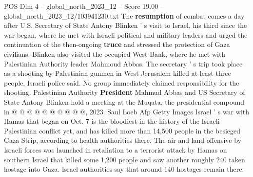 \begin{textsample}{POS Dim 4 – global\_north\_2023\_12 – Score 19.00 – global\_north\_2023\_12/103941230.txt}
The \textbf{resumption} of combat comes a day after U.S.
Secretary of State Antony Blinken ' s visit to Israel, his third since the war began, where he met with Israeli political and military leaders and urged the continuation of the then-ongoing \textbf{truce} and stressed the protection of Gaza civilians.
Blinken also visited the occupied West Bank, where he met with Palestinian Authority leader Mahmoud Abbas.
The secretary ' s trip took place as a shooting by Palestinian gunmen in West Jerusalem killed at least three people, Israeli police said.
No group immediately claimed responsibility for the shooting.
Palestinian Authority \textbf{President} Mahmud Abbas and US Secretary of State Antony Blinken hold a meeting at the Muqata, the presidential compound in @ @ @ @ @ @ @ @ @ @, 2023.
Saul Loeb Afp Getty Images Israel ' s war with Hamas that began on Oct. 7 is the bloodiest in the history of the Israeli-Palestinian conflict yet, and has killed more than 14,500 people in the besieged Gaza Strip, according to health authorities there.
The air and land offensive by Israeli forces was launched in retaliation to a terrorist attack by Hamas on southern Israel that killed some 1,200 people and saw another roughly 240 taken hostage into Gaza.
Israel authorities say that around 140 hostages remain there.

\end{textsample}
